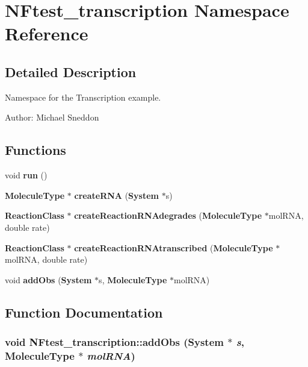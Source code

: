\section{NFtest\_\-transcription Namespace Reference}
\label{namespaceNFtest__transcription}


\subsection{Detailed Description}
Namespace for the Transcription example. 

\begin{Desc}
\item[Author:]Michael Sneddon \end{Desc}




\subsection*{Functions}
\begin{CompactItemize}
\item 
void {\bf run} ()
\item 
{\bf MoleculeType} $\ast$ {\bf createRNA} ({\bf System} $\ast$s)
\item 
{\bf ReactionClass} $\ast$ {\bf createReactionRNAdegrades} ({\bf MoleculeType} $\ast$molRNA, double rate)
\item 
{\bf ReactionClass} $\ast$ {\bf createReactionRNAtranscribed} ({\bf MoleculeType} $\ast$molRNA, double rate)
\item 
void {\bf addObs} ({\bf System} $\ast$s, {\bf MoleculeType} $\ast$molRNA)
\end{CompactItemize}


\subsection{Function Documentation}
\subsubsection{\setlength{\rightskip}{0pt plus 5cm}void NFtest\_\-transcription::addObs ({\bf System} $\ast$ {\em s}, {\bf MoleculeType} $\ast$ {\em molRNA})}\label{namespaceNFtest__transcription_f02b8df2214853a2649bb76eee5f4c93}


